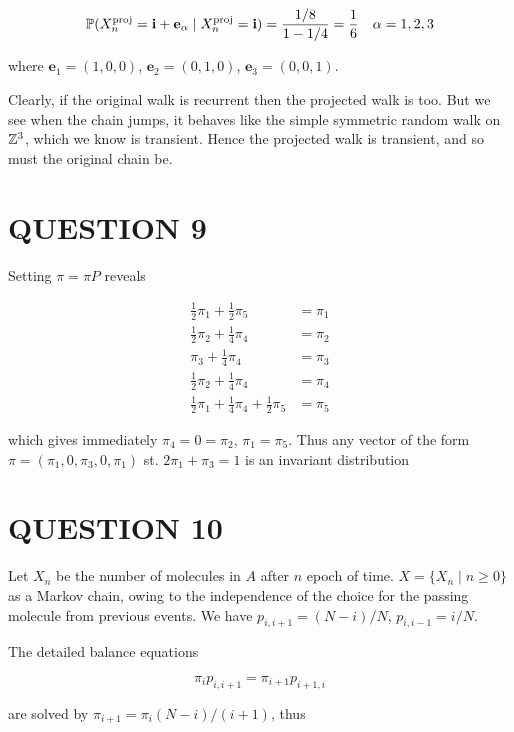 \documentclass[a4paper]{article}
\begin{document}
\[ \P(X_{n}^{\text{proj}} = \mathbf{i} + \mathbf{e}_{\alpha}  \; | \; X_{n}^{\text{proj}} = \mathbf{i} ) = \frac{1 / 8}{1 - 1/4} = \frac{1}{6} \quad \alpha =1,2,3  \]

where $ \mathbf{e}_{1} = (1,0,0) $, $ \mathbf{e}_{2} = (0,1,0) $, $ \mathbf{e}_{3} = (0,0,1) $.  

Clearly, if the original walk is recurrent then the projected walk is too. But we see when the chain jumps, it behaves like the simple symmetric random walk on $ \Z^{3} $, which we know is transient. Hence the projected walk is transient, and so must the original chain be.




\section{QUESTION 9}

Setting $ \pi = \pi P $ reveals

\begin{align*}
\frac{1}{2} \pi_{1} + \frac{1}{2} \pi_{5} & = \pi_{1} \\
\frac{1}{2} \pi_{2} + \frac{1}{4} \pi_{4}  & = \pi_{2} \\
\pi_{3} + \frac{1}{4} \pi_{4} & = \pi_{3} \\
\frac{1}{2} \pi_{2} + \frac{1}{4} \pi_{4} & =  \pi_{4} \\
\frac{1}{2} \pi_{1} + \frac{1}{4} \pi_{4} + \frac{1}{2} \pi_{5} & = \pi_{5} 
\end{align*}

which gives immediately $ \pi_{4} = 0 = \pi_{2} $, $ \pi_{1} = \pi_{5} $. Thus any vector of the form $ \pi = (\pi_{1},0,\pi_{3},0,\pi_{1}) $ st. $ 2 \pi_{1} + \pi_{3} = 1 $ is an invariant distribution 

\section{QUESTION 10}


Let $ X_{n} $ be the number of molecules in $ A $ after $ n $ epoch of time. $ X = \{  X_{n} \; | \; n \geq 0 \}  $ as a Markov chain, owing to the independence of the choice for the passing molecule from previous events. We have $ p_{i,i+1} = (N - i)/N $, $ p_{i,i-1} = i/N $. 

The detailed balance equations

\[ \pi_{i}p_{i,i+1} = \pi_{i+1}p_{i+1,i} \]

are solved by $ \pi_{i+1} = \pi_{i} (N - i)/(i+1) $, thus
\end{document}
